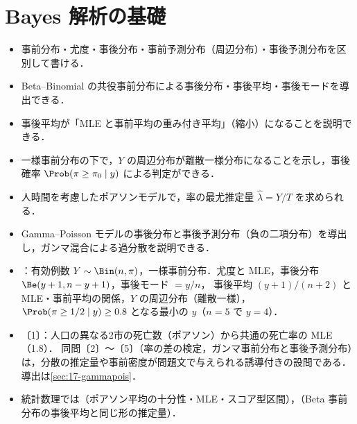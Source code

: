 \chapter{Bayes 解析の基礎}\label{ch:17}

\begin{goalbox}
\begin{itemize}
\item 事前分布・尤度・事後分布・事前予測分布（周辺分布）・事後予測分布を区別して書ける．
\item Beta--Binomial の共役事前分布による事後分布・事後平均・事後モードを導出できる．
\item 事後平均が「MLE と事前平均の重み付き平均」（縮小）になることを説明できる．
\item 一様事前分布の下で，$Y$ の周辺分布が離散一様分布になることを示し，事後確率 $\Prob(\pi\ge\pi_0\mid y)$ による判定ができる．
\item 人時間を考慮したポアソンモデルで，率の最尤推定量 $\hat\lambda=Y/T$ を求められる．
\item Gamma--Poisson モデルの事後分布と事後予測分布（負の二項分布）を導出し，ガンマ混合による過分散を説明できる．
\end{itemize}
\end{goalbox}

\begin{exambox}
\begin{itemize}
\item {}：有効例数 $Y\sim\Bin(n,\pi)$，一様事前分布．尤度と MLE，事後分布 $\Be(y+1,n-y+1)$，事後モード $=y/n$，
      事後平均 $(y+1)/(n+2)$ と MLE・事前平均の関係，$Y$ の周辺分布（離散一様），$\Prob(\pi\ge1/2\mid y)\ge0.8$ となる最小の $y$（$n=5$ で $y=4$）．
\item {}〔1〕：人口の異なる2市の死亡数（ポアソン）から共通の死亡率の MLE（1.8）．
      同問〔2〕〜〔5〕（率の差の検定，ガンマ事前分布と事後予測分布）は，分散の推定量や事前密度が問題文で与えられる誘導付きの設問である．導出は\cref{sec:17-gammapois}．
\item 統計数理では（ポアソン平均の十分性・MLE・スコア型区間），（Beta 事前分布の事後平均と同じ形の推定量）．
\end{itemize}
\end{exambox}


